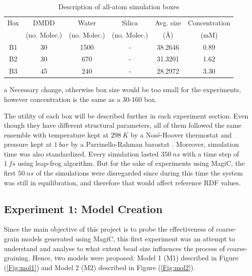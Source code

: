 \documentclass[10pt,a4paper,twoside]{article}
\begin{document}
\begin{table}[ht!] 
  \centering
\begin{threeparttable}

  \caption{Description of all-atom simulation boxes}

    \begin{tabular}{cccccc}
    \toprule
    Box &  DMDD &  Water & Silica & Avg. size & Concentration \\
	& (no. Molec.) & (no. Molec.) & (no. Molec.)  & (\AA) & (mM)\\
    \midrule
    B1   & 30  & 1500  & -  & 38.2646 & 0.89\\
    B2   & 30  & 670  & -   &  31.3201 & 1.62\\
    B3   & 45\tnote{a}  & 240  & -  & 28.2972 & 3.30\\
    \bottomrule
    \end{tabular}%
    \begin{tablenotes}
    	\item[a]Necessary change, otherwise box size would be too small for the experiments, however concentration is the same as a 30-160 box.
    \end{tablenotes}
  \label{tab:boxes}%
\end{threeparttable} 
\end{table}

The utility of each box will be described further in each experiment section. Even though they have different structural parameters, all of them followed the same ensemble with temperature kept at $298\ K$ by a Nosé-Hoover thermostat \cite{nose} \cite{hoover} and pressure kept at $1\ bar$ by a Parrinello-Rahman barostat \cite{prbstat}. Moreover, simulation time was also standardized. Every simulation lasted $350\ ns$ with a time step of $1\ fs$ using leap-frog algorithm. But for the sake of experiments using MagiC, the first $50\ ns$ of the simulations were disregarded since during this time the system was still in equilibration, and therefore that would affect reference RDF values.


\subsection{Experiment 1: Model Creation}
 Since the main objective of this project is to probe the effectiveness of coarse-grain models generated using MagiC, this first experiment was an attempt to understand and analyse to what extent bead size influences the process of coarse-graining. Hence, two models were proposed: Model 1 (M1) described in Figure (\ref{Fig:mol1}) and Model 2 (M2) described in Figure  (\ref{Fig:mol2}).
 
\end{document}
